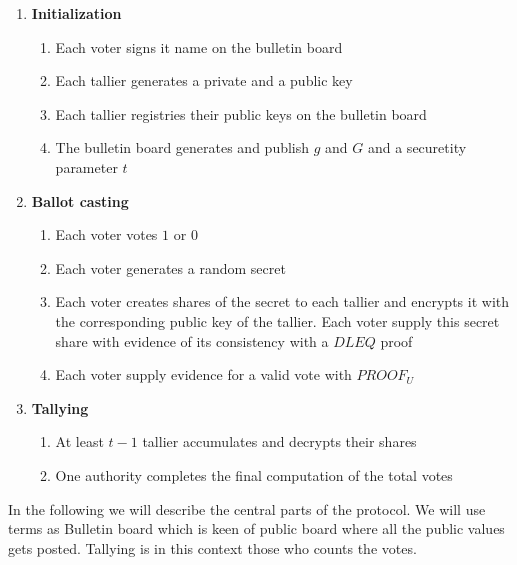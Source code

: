 \begin{infobox*}
\begin{enumerate}
\item \textbf{Initialization}
\begin{enumerate}
\item Each voter signs it name on the bulletin board
\item Each tallier generates a private and a public key
\item Each tallier registries their public keys on the bulletin board
\item The bulletin board generates and publish $g$ and $G$ and a securetity parameter $t$
\end{enumerate}
\item \textbf{Ballot casting}
\begin{enumerate}
\item Each voter votes $1$ or $0$
\item Each voter generates a random secret
\item Each voter creates shares of the secret to each tallier and encrypts it with the corresponding public key of the tallier. Each voter supply this secret share with evidence of its consistency with a $DLEQ$ proof
\item Each voter supply evidence for a valid vote with $PROOF_U$
\end{enumerate}
\item \textbf{Tallying}
\begin{enumerate}
\item At least $t-1$ tallier accumulates and decrypts their shares
\item One authority completes the final computation of the total votes
\end{enumerate}
\end{enumerate}
\end{infobox*}

\noindent
In the following we will describe the central parts of the protocol. We will use terms as Bulletin board which is keen of public board where all the public values gets posted. Tallying is in this context those who counts the votes.


